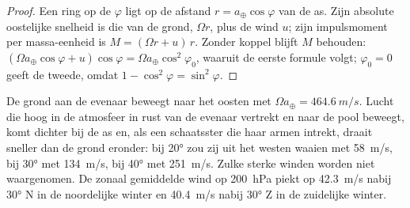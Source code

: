 \begin{proof}
Een ring op de  $\varphi$ ligt op de afstand $r = a_\oplus\cos\varphi$ van de
as. Zijn absolute oostelijke snelheid is die van de grond, $\Omega r$, plus de wind
$u$; zijn impulsmoment per massa-eenheid is $M = (\Omega r + u)\,r$. Zonder koppel
blijft $M$ behouden: $(\Omega a_\oplus\cos\varphi + u)\cos\varphi = \Omega a_\oplus
\cos^2\varphi_0$, waaruit de eerste formule volgt; $\varphi_0 = 0$ geeft de tweede, omdat
$1 - \cos^2\varphi = \sin^2\varphi$.
\end{proof}

De grond aan de evenaar beweegt naar het oosten met $\Omega a_\oplus = \qty{464.6}{m/s}$. Lucht die
hoog in de atmosfeer in rust van de evenaar vertrekt en naar de pool beweegt, komt dichter bij de as en, als een
schaatsster die haar armen intrekt, draait sneller dan de grond eronder: bij
\ang{20} zou zij uit het westen waaien met \qty{58}{m/s}, bij \ang{30} met
\qty{134}{m/s}, bij \ang{40} met \qty{251}{m/s}. Zulke sterke winden worden niet waargenomen.
De zonaal gemiddelde wind op \qty{200}{hPa} piekt op \qty{42.3}{m/s} nabij \ang{30} N in de
noordelijke winter en \qty{40.4}{m/s} nabij \ang{30} Z in de zuidelijke winter.

